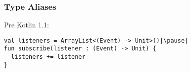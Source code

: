 




\begin{frame}[fragile] \frametitle{Type Aliases}
Pre Kotlin 1.1:
\pause
\begin{lstlisting}
val listeners = ArrayList<(Event) -> Unit>()|\pause|
fun subscribe(listener : (Event) -> Unit) {
  listeners += listener
}
\end{lstlisting}
\end{frame}